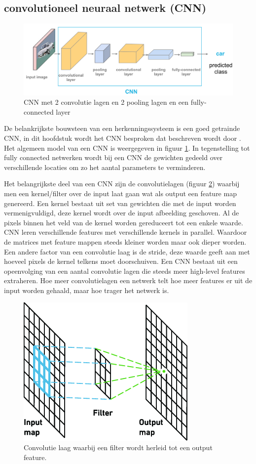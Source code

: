 
\subsection{convolutioneel neuraal netwerk (CNN) }
\begin{figure}[!ht]
    \centering
 	\includegraphics[width=0.80\linewidth]{fig/CNN.png}
 	\caption{CNN met 2 convolutie lagen en 2 pooling lagen en een fully-connected layer}
 	\label{fig:cnn}
\end{figure}

De belankrijkste bouwsteen van een herkenningssysteem is een goed getrainde CNN, in dit hoofdstuk wordt het CNN besproken dat beschreven wordt door \cite{jiang_deep_2019}.
Het algemeen model van een CNN is weergegeven in figuur \ref{fig:cnn}. 
In tegenstelling tot fully connected netwerken wordt bij een CNN de gewichten gedeeld over verschillende locaties om zo het aantal parameters te verminderen.
 
Het belangrijkste deel van een CNN zijn de convolutielagen (figuur \ref{fig:conv_laag}) waarbij men een kernel/filter over de input laat gaan wat als output een feature map genereerd. 
Een kernel bestaat uit set van gewichten die met de input worden vermenigvuldigd, deze kernel wordt over de input afbeelding geschoven. 
Al de pixels binnen het veld van de kernel worden gereduceert tot een enkele waarde. 
CNN leren verschillende features met verschillende kernels in parallel. 
Waardoor de matrices met feature mappen steeds kleiner worden maar ook dieper worden. Een andere factor van een convolutie laag is de stride, deze waarde geeft aan met hoeveel pixels de kernel telkens moet doorschuiven. 
Een CNN bestaat uit een opeenvolging van een aantal convolutie lagen die steeds meer high-level features extraheren. 
Hoe meer convolutielagen een netwerk telt hoe meer features er uit de input worden gehaald, maar hoe trager het netwerk is. 

\begin{figure}[!ht]
	\centering
	\includegraphics[width=0.35\linewidth]{fig/convolution layer.png}
	\caption{Convolutie laag waarbij een filter wordt herleid tot een output feature.}
	\label{fig:conv_laag}
\end{figure}

